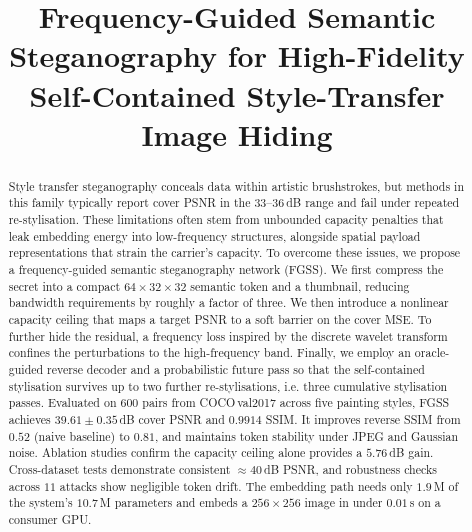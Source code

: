 \documentclass[conference]{IEEEtran}
\begin{document}
\title{Frequency-Guided Semantic Steganography for High-Fidelity Self-Contained Style-Transfer Image Hiding}

\author{
\and
{}
\and
{}
}

\maketitle

\begin{abstract}
Style transfer steganography conceals data within artistic brushstrokes, but methods in this family typically report cover PSNR in the $33$--$36$\,dB range and fail under repeated re-stylisation. These limitations often stem from unbounded capacity penalties that leak embedding energy into low-frequency structures, alongside spatial payload representations that strain the carrier's capacity. To overcome these issues, we propose a frequency-guided semantic steganography network (FGSS). We first compress the secret into a compact $64\!\times\!32\!\times\!32$ semantic token and a thumbnail, reducing bandwidth requirements by roughly a factor of three. We then introduce a nonlinear capacity ceiling that maps a target PSNR to a soft barrier on the cover MSE. To further hide the residual, a frequency loss inspired by the discrete wavelet transform confines the perturbations to the high-frequency band. Finally, we employ an oracle-guided reverse decoder and a probabilistic future pass so that the self-contained stylisation survives up to two further re-stylisations, i.e. three cumulative stylisation passes. Evaluated on $600$ pairs from COCO\,val2017 across five painting styles, FGSS achieves $39.61\pm0.35$\,dB cover PSNR and $0.9914$ SSIM. It improves reverse SSIM from $0.52$ (naive baseline) to $0.81$, and maintains token stability under JPEG and Gaussian noise. Ablation studies confirm the capacity ceiling alone provides a $5.76$\,dB gain. Cross-dataset tests demonstrate consistent $\approx\!40$\,dB PSNR, and robustness checks across $11$ attacks show negligible token drift. The embedding path needs only $1.9$\,M of the system's $10.7$\,M parameters and embeds a $256\!\times\!256$ image in under $0.01$\,s on a consumer GPU.
\end{abstract}
\end{document}
